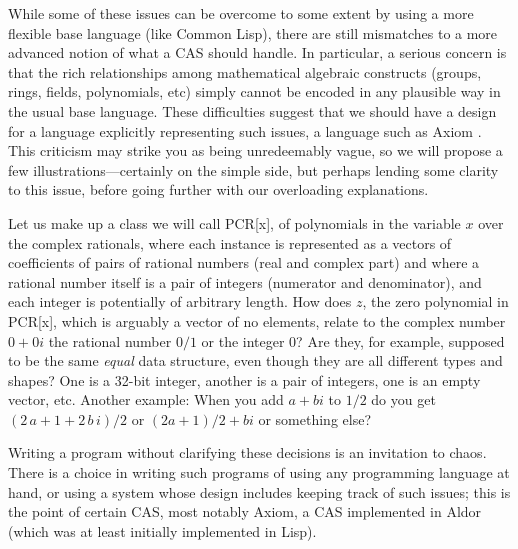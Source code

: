 \documentclass{article}
\begin{document}
{While some of these issues can be overcome to some extent by using a
more flexible base language (like Common Lisp), there are still
mismatches to a more advanced notion of what a CAS should handle.  In
particular, a serious concern is that the rich relationships among
mathematical algebraic constructs (groups, rings, fields, polynomials,
etc) simply cannot be encoded in any plausible way in the usual base
language.  These difficulties suggest that we should have a design for
a language explicitly representing such issues, a language such as Axiom
\cite{jenks}. This criticism may strike you as being unredeemably
vague, so we will propose a few illustrations---certainly on the
simple side, but perhaps lending some clarity to this issue, before
going further with our overloading explanations.

Let us make up a class we will call PCR[x], of polynomials in the
variable $x$ over the complex rationals, where each instance is
represented as a vectors of coefficients of pairs of rational numbers
(real and complex part) and where a rational number itself is a pair
of integers (numerator and denominator), and each integer is
potentially of arbitrary length.  How does $z$, the zero polynomial in
PCR[x], which is arguably a vector of no elements, relate to the
complex number $0+0i$ the rational number $0/1$ or the integer 0? Are
they, for example, supposed to be the same {\em equal} data structure,
even though they are all different types and shapes? One is a 32-bit
integer, another is a pair of integers, one is an empty vector, etc.
Another example: When you add $a+b i$ to $1/2$ do you get $
(2\,a+1+2\,b\,i)/2$ or $(2a+1)/2+b i$ or something else?  

Writing a program without clarifying these decisions is an invitation
to chaos. There is a choice in writing such programs of using any
programming language at hand, or using a system whose design
includes keeping track of such issues; this is the point of certain CAS,
most notably Axiom, a CAS implemented in Aldor (which was at least
initially implemented in Lisp).
}
\end{document}
